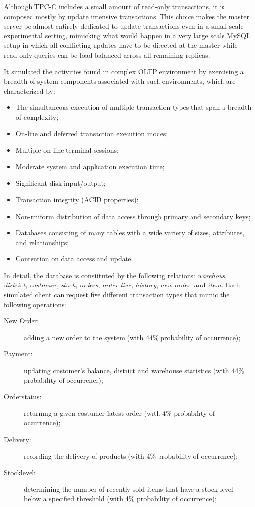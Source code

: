 Although TPC-C includes a small amount of read-only transactions, it is composed mostly by update intensive transactions. This choice makes the master server be almost entirely dedicated to update transactions even in a small scale experimental setting, mimicking what would happen in a very large scale MySQL setup in which all conflicting updates have to be directed at the master while read-only queries can be load-balanced across all remaining replicas.

It simulated the activities found in complex OLTP environment by exercising a breadth of system components associated with such environments, which are characterized by:

\begin{itemize}
	\item The simultaneous execution of multiple transaction types that span a breadth of complexity;
	\item On-line and deferred transaction execution modes;
 	\item Multiple on-line terminal sessions;
 	\item Moderate system and application execution time;
 	\item Significant disk input/output;
 	\item Transaction integrity (ACID properties);
 	\item Non-uniform distribution of data access through primary and secondary keys;
 	\item Databases consisting of many tables with a wide variety of sizes, attributes, and relationships; 
 	\item Contention on data access and update.
\end{itemize}

 In detail, the database is constituted by the following relations: \emph{warehous}, \emph{district}, \emph{customer}, \emph{stock}, \emph{orders}, \emph{order line}, \emph{history}, \emph{new order}, and \emph{item}. Each simulated client can request five different transaction types that mimic the following operations:
 
\begin{description}
 	\item[New Order:] adding a new order to the system (with 44\% probability of occurrence);
 	\item[Payment:] updating customer's balance, district and warehouse statistics (with 44\% probability of occurrence);
 	\item[Orderstatus:] returning a given costumer latest order (with 4\% probability of occurrence);
 	\item[Delivery:] recording the delivery of products (with 4\% probability of occurrence);
 	\item[Stocklevel:] determining the number of recently sold items that have a stock level below a specified threshold (with 4\% probability of occurrence);
\end{description}

